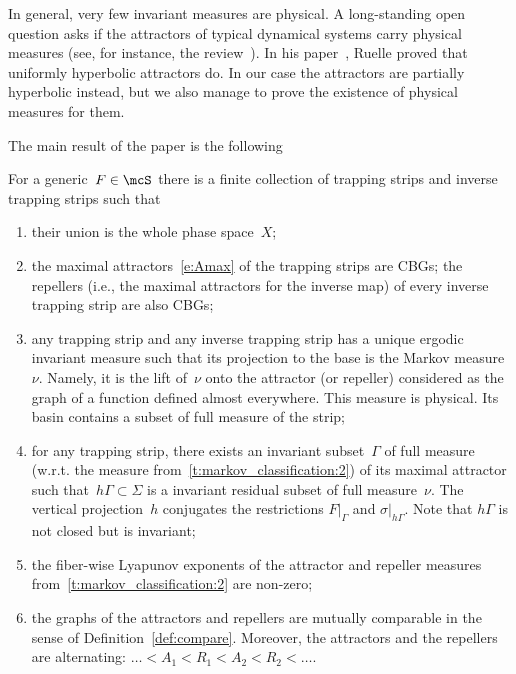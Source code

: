 \documentclass[a4paper,12pt]{amsart}
\begin{document}
In general, very few invariant measures are physical. A long-standing open question asks if the attractors of typical dynamical systems carry physical measures (see, for instance, the review~\cite{Palis2005}). In his paper~\cite{Ruelle1976}, Ruelle proved that uniformly hyperbolic attractors do. In our case the attractors are partially hyperbolic instead, but we also manage to prove the existence of physical measures for them.

The main result of the paper is the following


\begin{Thm}\label{t:markov_classification}
For a generic~$F \in \mcS$ there is a finite collection of trapping strips and inverse trapping strips such that
\begin{enumerate}
\item\label{t:markov_classification:0.5} their union is the whole phase space~$X$;
\item\label{t:markov_classification:1} the maximal attractors~\eqref{e:Amax} of the trapping strips are CBGs; the repellers (i.e., the maximal attractors for the inverse map) of every inverse trapping strip are also CBGs;
\item\label{t:markov_classification:2} any trapping strip and any inverse trapping strip has a unique ergodic invariant measure such that its projection to the base is the Markov measure~$\nu$. Namely, it is the lift of~$\nu$ onto the attractor (or repeller) considered as the graph of a function defined almost everywhere. This measure is physical. Its basin contains a subset of full measure of the strip;
\item\label{t:markov_classification:2.5} for any trapping strip, there exists an invariant subset~$\Gamma$ of full measure (w.r.t. the measure from~\ref{t:markov_classification:2}) of its maximal attractor such that~$h\Gamma \subset \Sigma$ is a invariant residual subset of full measure~$\nu$. The vertical projection~$h$ conjugates the restrictions $F|_\Gamma$ and $\sigma|_{h\Gamma}$.
    Note that $h\Gamma$ is not closed but is invariant;
\item\label{t:markov_classification:3} the fiber-wise Lyapunov exponents of the attractor and repeller measures from~\ref{t:markov_classification:2} are non-zero;
\item\label{t:markov_classification:4} the graphs of the attractors and repellers are mutually comparable in the sense of Definition~\ref{def:compare}. Moreover, the attractors and the repellers are alternating: $\dots < A_1 < R_1 < A_2 < R_2 < \dots$.
\end{enumerate}
\end{Thm}
\end{document}
